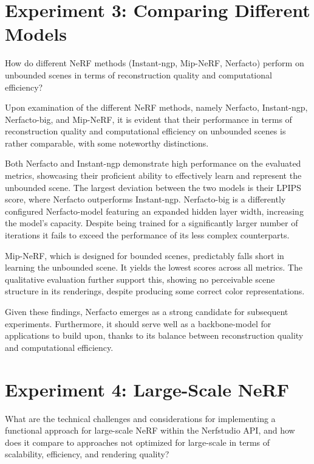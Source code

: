 \section{Experiment 3: Comparing Different Models}
\begin{description}[leftmargin=!,labelwidth=\widthof{RQ 1:}]
\item[\textbf{RQ 3:}] How do different NeRF methods (Instant-ngp\cite{mullerInstantNeuralGraphics2022}, Mip-NeRF\cite{barronMipNeRFMultiscaleRepresentation2021}, Nerfacto\cite{tancik_nerfstudio_2023}) perform on unbounded scenes in terms of reconstruction quality and computational efficiency?
\end{description}

Upon examination of the different NeRF methods, namely Nerfacto, Instant-ngp, Nerfacto-big, and Mip-NeRF, it is evident that their performance in terms of reconstruction quality and computational efficiency on unbounded scenes is rather comparable, with some noteworthy distinctions.

Both Nerfacto and Instant-ngp demonstrate high performance on the evaluated metrics, showcasing their proficient ability to effectively learn and represent the unbounded scene. The largest deviation between the two models is their LPIPS score, where Nerfacto outperforms Instant-ngp. Nerfacto-big is a differently configured Nerfacto-model featuring an expanded hidden layer width, increasing the model's capacity. Despite being trained for a significantly larger number of iterations it fails to exceed the performance of its less complex counterparts.

Mip-NeRF, which is designed for bounded scenes, predictably falls short in learning the unbounded scene. It yields the lowest scores across all metrics. The qualitative evaluation further support this, showing no perceivable scene structure in its renderings, despite producing some correct color representations.

Given these findings, Nerfacto emerges as a strong candidate for subsequent experiments. Furthermore, it should serve well as a backbone-model for applications to build upon, thanks to its balance between reconstruction quality and computational efficiency.



\section{Experiment 4: Large-Scale NeRF}
\begin{description}[leftmargin=!,labelwidth=\widthof{RQ 1:}]
\item[\textbf{RQ 4:}] What are the technical challenges and considerations for implementing a functional approach for large-scale NeRF within the Nerfstudio API, and how does it compare to approaches not optimized for large-scale in terms of scalability, efficiency, and rendering quality?
\end{description}

